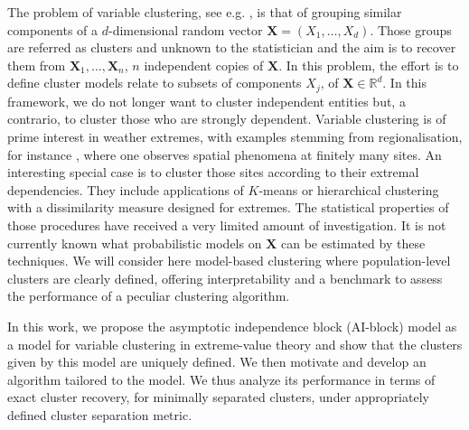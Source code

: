 \documentclass[11pt]{article}
\theoremstyle{definition}
\begin{document}
	The problem of variable clustering, see e.g. \cite{bunea2020model, eisenach2020high}, is that of grouping similar components of a $d$-dimensional random vector $\textbf{X} = (X_1,\dots,X_d)$. Those groups are referred as clusters and unknown to the statistician and the aim is to recover them from $\textbf{X}_1, \dots, \textbf{X}_n$, $n$ independent copies of $\textbf{X}$. In this problem, the effort is to define cluster models relate to subsets of components $X_j$, of $\textbf{X} \in \mathbb{R}^d$. In this framework, we do not longer want to cluster independent entities but, a contrario, to cluster those who are strongly dependent. Variable clustering is of prime interest in weather extremes, with examples stemming from regionalisation, for instance \cite{bador2015spatial,bernard2013clustering, saunders2021regionalisation}, where one observes spatial phenomena at finitely many sites. An interesting special case is to cluster those sites according to their extremal dependencies. They include applications of $K$-means or hierarchical clustering with a dissimilarity measure designed for extremes. The statistical properties of those procedures have received a very limited amount of investigation. It is not currently known what probabilistic models on $\textbf{X}$ can be estimated by these techniques. We will consider here model-based clustering where population-level clusters are clearly defined, offering interpretability and a benchmark to assess the performance of a peculiar clustering algorithm.
	
	In this work, we propose the asymptotic independence block (AI-block) model as a model for variable clustering in extreme-value theory and show that the clusters given by this model are uniquely defined. We then motivate and develop an algorithm tailored to the model. We thus analyze its performance in terms of exact cluster recovery, for minimally separated clusters, under appropriately defined cluster separation metric.
\end{document}
